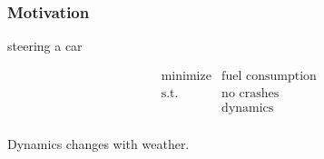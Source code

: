 
\begin{frame}
\frametitle{Motivation}


 steering a car 
 
 \begin{align*}
&\text{minimize} & \text{fuel consumption } \\
 & \text{s.t. } & \text{no crashes} \\
 & & \text{dynamics}\\

\end{align*}

\begin{block}{}
Dynamics changes with weather.

\end{block}

\end{frame}



